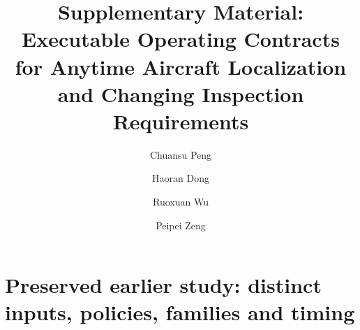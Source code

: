 \documentclass[final,3p,times]{elsarticle}
\begin{document}
\begin{frontmatter}
\title{Supplementary Material: Executable Operating Contracts for Anytime Aircraft Localization and Changing Inspection Requirements}
\author[ae]{Chuansu Peng}
\author[ae]{Haoran Dong}
\author[ae]{Ruoxuan Wu}
\author[etc]{Peipei Zeng}
\address[ae]{School of Aeronautical Engineering, Civil Aviation University of China, China}
\address[etc]{Engineering Training Center, Civil Aviation University of China, China}
\end{frontmatter}
\suppressfloats[t]



\FloatBarrier
\section*{Preserved earlier study: distinct inputs, policies, families and timing}




\end{document}
